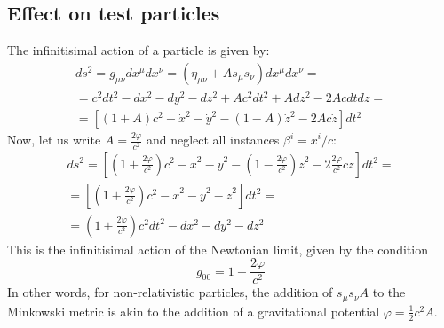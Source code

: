 \documentclass{article}
\begin{document}
\subsection{Effect on test particles}
The infinitisimal action of a particle is given by: 
\begin{equation}
\begin{gathered}
    ds^2 = g_{\mu\nu}dx^\mu dx^\nu = \left(\eta_{\mu\nu} + A s_\mu s_\nu\right) dx^\mu dx^\nu = \\ =
    c^2dt^2 - dx^2 - dy^2 - dz^2 + Ac^2dt^2 + A dz^2 - 2Acdtdz
    = \\ =
    \left[(1 + A)c^2 - \dot{x}^2 - \dot{y}^2 - (1 - A)\dot{z}^2 - 2Ac\dot{z}\right] dt^2
\end{gathered}
\end{equation}
Now, let us write $A = \frac{2\varphi}{c^2}$ and neglect all instances $\beta^i = \dot{x}^i/c$:
\begin{equation}
\begin{gathered}
    ds^2 = 
    \left[\left(1 + \frac{2\varphi}{c^2}\right)c^2 - \dot{x}^2 - \dot{y}^2 - \left(1 - \frac{2\varphi}{c^2}\right)\dot{z}^2 - 2\frac{2\varphi}{c^2}c\dot{z}\right] dt^2
    = \\ =
    \left[\left(1 + \frac{2\varphi}{c^2}\right)c^2 - \dot{x}^2 - \dot{y}^2 - \dot{z}^2\right] dt^2
    = \\ =
    \left(1 + \frac{2\varphi}{c^2}\right)c^2 dt^2 - dx^2 - dy^2 - dz^2
\end{gathered}
\end{equation}
This is the infinitisimal action of the Newtonian limit, given by the condition
\begin{equation}
    g_{00} = 1 + \frac{2\varphi}{c^2}
\end{equation}
In other words, for non-relativistic particles, the addition of $s_\mu s_\nu A$ to the Minkowski metric is akin to the addition of a gravitational potential $\varphi = \frac{1}{2}c^2A$.
\end{document}

